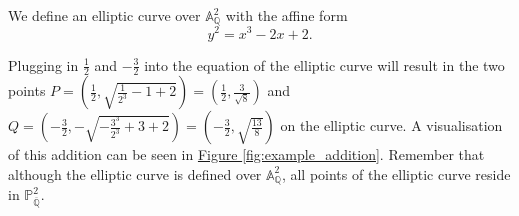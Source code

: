 \documentclass[openany, a4paper, 10pt]{book}
\theoremstyle{plain}
\theoremstyle{plain}
\theoremstyle{plain}
\theoremstyle{definition}
\theoremstyle{plain}
\theoremstyle{definition}
\theoremstyle{remark}
\newcommand{\figref}[1]{\hyperref[#1]{Figure \ref{#1}}}
\begin{document}
\begin{examplebox}
    We define an elliptic curve over $\mathbb A_{\mathbb Q}^2$ with the affine form
    \begin{equation}\label{eq:EC_example}
        y^2 = x^3 -2x + 2.
    \end{equation}

    Plugging in $\frac{1}{2}$ and $-\frac{3}{2}$ into the equation of the elliptic curve will result in the two points
    $P=\left(\frac{1}{2}, \sqrt{\frac{1}{2^3} - 1 + 2}\right) = \left( \frac{1}{2}, \frac{3}{\sqrt{8}} \right)$
    and
    $Q=\left(-\frac{3}{2}, -\sqrt{-\frac{3^3}{2^3} + 3 + 2}\right) = \left(-\frac{3}{2}, \sqrt{\frac{13}{8}}\right)$
    on the elliptic curve.
    A visualisation of this addition can be seen in \figref{fig:example_addition}.
    Remember that although the elliptic curve is defined over $\mathbb A_{\mathbb Q}^2$, all points of the elliptic curve reside in $\mathbb P_{\overline{\mathbb Q}}^2$.


\end{examplebox}
\end{document}
